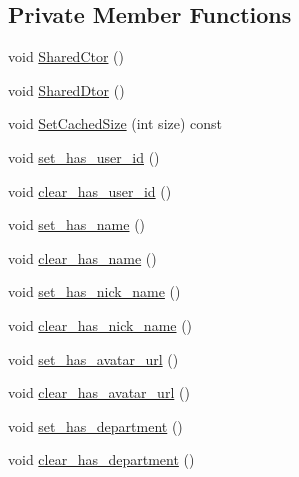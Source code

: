 \subsection*{Private Member Functions}
\begin{DoxyCompactItemize}
\item 
void \hyperlink{class_i_m_1_1_base_define_1_1_server_user_info_aae35fcd04e78cf3d4426f1be8c69567e}{Shared\+Ctor} ()
\item 
void \hyperlink{class_i_m_1_1_base_define_1_1_server_user_info_acdff2c6c250160839b9dc8e4643d433e}{Shared\+Dtor} ()
\item 
void \hyperlink{class_i_m_1_1_base_define_1_1_server_user_info_a94d131a3a676863eb33f8ece4aa650f1}{Set\+Cached\+Size} (int size) const 
\item 
void \hyperlink{class_i_m_1_1_base_define_1_1_server_user_info_a8f5008691f9afb7d9c8092c50d00c86e}{set\+\_\+has\+\_\+user\+\_\+id} ()
\item 
void \hyperlink{class_i_m_1_1_base_define_1_1_server_user_info_af51120dcac7042c7b972d8460272a64b}{clear\+\_\+has\+\_\+user\+\_\+id} ()
\item 
void \hyperlink{class_i_m_1_1_base_define_1_1_server_user_info_a0c74a998f8a0adc3768da357ddc53538}{set\+\_\+has\+\_\+name} ()
\item 
void \hyperlink{class_i_m_1_1_base_define_1_1_server_user_info_aaf56a4a2a4f7f12e227e729fe2fbb871}{clear\+\_\+has\+\_\+name} ()
\item 
void \hyperlink{class_i_m_1_1_base_define_1_1_server_user_info_ac7dea35d17685e71b089fe4ffeb6cda4}{set\+\_\+has\+\_\+nick\+\_\+name} ()
\item 
void \hyperlink{class_i_m_1_1_base_define_1_1_server_user_info_a3105128e997424f919cc72c923667cd3}{clear\+\_\+has\+\_\+nick\+\_\+name} ()
\item 
void \hyperlink{class_i_m_1_1_base_define_1_1_server_user_info_a4a9135ef50a393cdc9ad266c5b760453}{set\+\_\+has\+\_\+avatar\+\_\+url} ()
\item 
void \hyperlink{class_i_m_1_1_base_define_1_1_server_user_info_a9865623724ab09ec2b3c63bc7ef9f584}{clear\+\_\+has\+\_\+avatar\+\_\+url} ()
\item 
void \hyperlink{class_i_m_1_1_base_define_1_1_server_user_info_a02b94e5bc895e8487c0d57c03113c84b}{set\+\_\+has\+\_\+department} ()
\item 
void \hyperlink{class_i_m_1_1_base_define_1_1_server_user_info_aa2d984e0f3ee5316224111a60b12ef56}{clear\+\_\+has\+\_\+department} ()
\item 

\end{DoxyCompactItemize}
